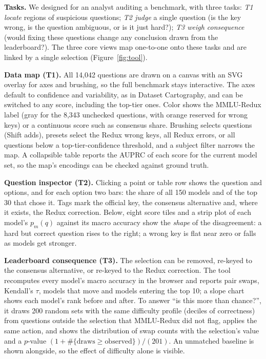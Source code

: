 \documentclass[10pt]{article}
\begin{document}
\textbf{Tasks.} We designed for an analyst auditing a benchmark, with three tasks: \emph{T1 locate}
regions of suspicious questions; \emph{T2 judge} a single question (is the key wrong, is the question
ambiguous, or is it just hard?); \emph{T3 weigh consequence} (would fixing these questions change any
conclusion drawn from the leaderboard?). The three core views map one-to-one onto these tasks and are
linked by a single selection (Figure~\ref{fig:tool}).

\textbf{Data map (T1).} All 14,042 questions are drawn on a canvas with an SVG overlay for axes and
brushing, so the full benchmark stays interactive. The axes default to confidence and variability,
as in Dataset Cartography, and can be switched to any score, including the top-tier ones. Color shows
the MMLU-Redux label (gray for the 8,343 unchecked questions, with orange reserved for wrong keys) or a
continuous score such as consensus share. Brushing selects questions (Shift adds), presets select the
Redux wrong keys, all Redux errors, or all questions below a top-tier-confidence threshold, and a
subject filter narrows the map. A collapsible table reports the AUPRC of each score for the current
model set, so the map's encodings can be checked against ground truth.

\textbf{Question inspector (T2).} Clicking a point or table row shows the question and options, and
for each option two bars: the share of all 150 models and of the top 30 that chose it. Tags mark the
official key, the consensus alternative and, where it exists, the Redux correction. Below, eight
score tiles and a strip plot of each model's $p_m(q)$ against its macro accuracy show the
\emph{shape} of the disagreement: a hard but correct question rises to the right; a wrong key is
flat near zero or falls as models get stronger.

\textbf{Leaderboard consequence (T3).} The selection can be removed, re-keyed to the consensus
alternative, or re-keyed to the Redux correction. The tool recomputes every model's macro accuracy in
the browser and reports pair swaps, Kendall's $\tau$, models that move and models entering the top 10;
a slope chart shows each model's rank before and after. To answer ``is this more than chance?'', it
draws 200 random sets with the same difficulty profile (deciles of correctness) from questions outside
the selection that MMLU-Redux did not flag, applies the same action, and shows the distribution of swap
counts with the selection's value and a $p$-value $(1+\#\{\text{draws}\ge\text{observed}\})/(201)$.
An unmatched baseline is shown alongside, so the effect of difficulty alone is visible.
\end{document}
